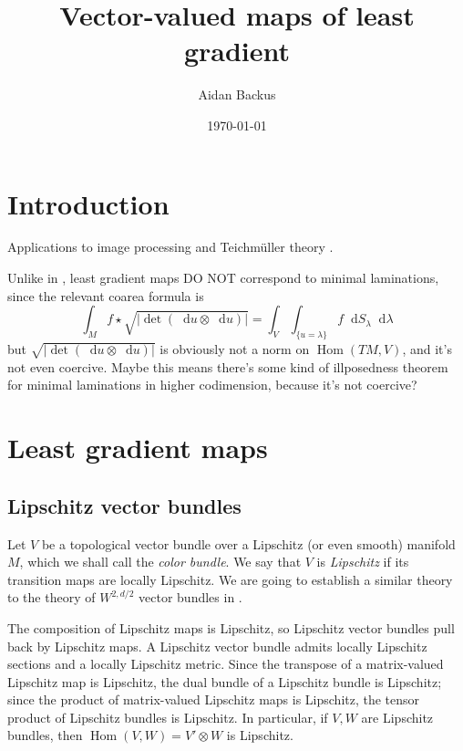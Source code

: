 \documentclass[reqno,11pt]{amsart}
\title{Vector-valued maps of least gradient}
\author{Aidan Backus}
\date{\today}
\newcommand*\dif{\mathop{}\!\mathrm{d}}
\DeclareMathOperator{\Hom}{Hom}
\newcommand{\dfn}[1]{\emph{#1}\index{#1}}
\theoremstyle{definition}
\numberwithin{equation}{section}
\begin{document}
\begin{abstract}

\end{abstract}

\maketitle

\section{Introduction}
Applications to image processing \cite{Goldluecke10} and Teichm\"uller theory \cite{daskalopoulos2022analytic}.

Unlike in \cite{BackusCML}, least gradient maps DO NOT correspond to minimal laminations, since the relevant coarea formula is 
$$\int_M f \star \sqrt{|\det(\dif u \otimes \dif u)|} = \int_V \int_{\{u = \lambda\}} f \dif S_\lambda \dif \lambda$$
but $\sqrt{|\det(\dif u \otimes \dif u)|}$ is obviously not a norm on $\Hom(TM, V)$, and it's not even coercive.
Maybe this means there's some kind of illposedness theorem for minimal laminations in higher codimension, because it's not coercive?

\section{Least gradient maps}
\subsection{Lipschitz vector bundles}
Let $V$ be a topological vector bundle over a Lipschitz (or even smooth) manifold $M$, which we shall call the \dfn{color bundle}.
We say that $V$ is \dfn{Lipschitz} if its transition maps are locally Lipschitz.
We are going to establish a similar theory to the theory of $W^{2, d/2}$ vector bundles in \cite{Oh_2018}.

The composition of Lipschitz maps is Lipschitz, so Lipschitz vector bundles pull back by Lipschitz maps.
A Lipschitz vector bundle admits locally Lipschitz sections and a locally Lipschitz metric.
Since the transpose of a matrix-valued Lipschitz map is Lipschitz, the dual bundle of a Lipschitz bundle is Lipschitz; since the product of matrix-valued Lipschitz maps is Lipschitz, the tensor product of Lipschitz bundles is Lipschitz.
In particular, if $V, W$ are Lipschitz bundles, then $\Hom(V, W) = V' \otimes W$ is Lipschitz.
\end{document}
